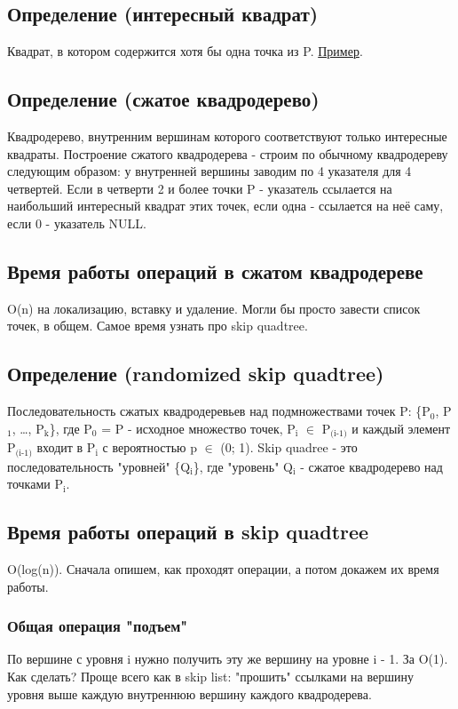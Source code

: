 \documentclass[11pt]{article}
\begin{document}
\subsection{Определение (интересный квадрат)}
\label{sec:orgheadline4}
Квадрат, в котором содержится хотя бы одна точка из P. \href{http://neerc.ifmo.ru/wiki/images/e/ea/Compressed_Quadtree.png}{Пример}.
\subsection{Определение (сжатое квадродерево)}
\label{sec:orgheadline5}
Квадродерево, внутренним вершинам которого соответствуют только
интересные квадраты.
Построение сжатого квадродерева - строим по обычному квадродереву
следующим образом: у внутренней вершины заводим по 4 указателя для
4 четвертей. Если в четверти 2 и более точки P - указатель
ссылается на наибольший интересный квадрат этих точек, если одна -
ссылается на неё саму, если 0 - указатель NULL.
\subsection{Время работы операций в сжатом квадродереве}
\label{sec:orgheadline6}
O(n) на локализацию, вставку и удаление. Могли бы просто завести
список точек, в общем. Самое время узнать про skip quadtree.
\subsection{Определение (randomized skip quadtree)}
\label{sec:orgheadline7}
Последовательность сжатых квадродеревьев над подмножествами точек
P: \{P\(_{\text{0}}\), P\(_{\text{1}}\), \ldots{}, P\(_{\text{k}}\)\}, где P\(_{\text{0}}\) = P - исходное множество точек,
P\(_{\text{i}}\) \(\in\) P\(_{\text{(i-1)}}\) и каждый элемент P\(_{\text{(i-1)}}\) входит в P\(_{\text{i}}\) с
вероятностью p \(\in\) (0; 1). Skip quadree - это последовательность
"уровней" \{Q\(_{\text{i}}\)\}, где "уровень" Q\(_{\text{i}}\) - сжатое квадродерево над
точками P\(_{\text{i}}\).
\subsection{Время работы операций в skip quadtree}
\label{sec:orgheadline15}
O(log(n)). Сначала опишем, как проходят операции, а потом докажем
их время работы.
\subsubsection{Общая операция "подъем"}
\label{sec:orgheadline8}
По вершине с уровня i нужно получить эту же вершину на уровне
i - 1. За O(1). Как сделать? Проще всего как в skip list:
"прошить" ссылками на вершину уровня выше каждую внутреннюю
вершину каждого квадродерева.
\end{document}
